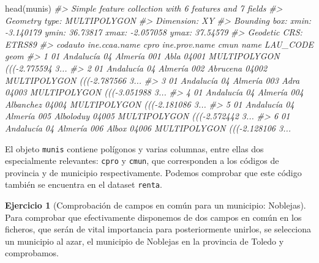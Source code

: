 \documentclass[
]{report}
\newenvironment{Shaded}{\begin{snugshade}}{\end{snugshade}}
\newcommand{\CommentTok}[1]{\textcolor[rgb]{0.56,0.35,0.01}{\textit{#1}}}
\newcommand{\FunctionTok}[1]{\textcolor[rgb]{0.00,0.00,0.00}{#1}}
\newcommand{\NormalTok}[1]{#1}
\theoremstyle{definition}
\theoremstyle{definition}
\theoremstyle{definition}
\newtheorem{exercise}{Ejercicio}[chapter]
\theoremstyle{definition}
\theoremstyle{remark}
\begin{document}
\begin{Shaded}
\begin{Highlighting}[]
\FunctionTok{head}\NormalTok{(munis)}
\CommentTok{\#\textgreater{} Simple feature collection with 6 features and 7 fields}
\CommentTok{\#\textgreater{} Geometry type: MULTIPOLYGON}
\CommentTok{\#\textgreater{} Dimension:     XY}
\CommentTok{\#\textgreater{} Bounding box:  xmin: {-}3.140179 ymin: 36.73817 xmax: {-}2.057058 ymax: 37.54579}
\CommentTok{\#\textgreater{} Geodetic CRS:  ETRS89}
\CommentTok{\#\textgreater{}   codauto ine.ccaa.name cpro ine.prov.name cmun      name LAU\_CODE                           geom}
\CommentTok{\#\textgreater{} 1      01     Andalucía   04       Almería  001      Abla    04001 MULTIPOLYGON ((({-}2.775594 3...}
\CommentTok{\#\textgreater{} 2      01     Andalucía   04       Almería  002  Abrucena    04002 MULTIPOLYGON ((({-}2.787566 3...}
\CommentTok{\#\textgreater{} 3      01     Andalucía   04       Almería  003      Adra    04003 MULTIPOLYGON ((({-}3.051988 3...}
\CommentTok{\#\textgreater{} 4      01     Andalucía   04       Almería  004 Albanchez    04004 MULTIPOLYGON ((({-}2.181086 3...}
\CommentTok{\#\textgreater{} 5      01     Andalucía   04       Almería  005 Alboloduy    04005 MULTIPOLYGON ((({-}2.572442 3...}
\CommentTok{\#\textgreater{} 6      01     Andalucía   04       Almería  006     Albox    04006 MULTIPOLYGON ((({-}2.128106 3...}
\end{Highlighting}
\end{Shaded}

El objeto \texttt{munis} contiene polígonos y varias columnas, entre ellas dos
especialmente relevantes: \texttt{cpro} y \texttt{cmun}, que corresponden a los códigos de
provincia y de municipio respectivamente. Podemos comprobar que este código
también se encuentra en el dataset \texttt{renta}.

\begin{exercise}[Comprobación de campos en común para un municipio: Noblejas]
\protect\hypertarget{exr:ex17}{}\label{exr:ex17}Para comprobar que efectivamente disponemos de dos campos en común en los
ficheros, que serán de vital importancia para posteriormente unirlos, se
selecciona un municipio al azar, el municipio de Noblejas en la provincia de
Toledo y comprobamos.
\end{exercise}
\end{document}
